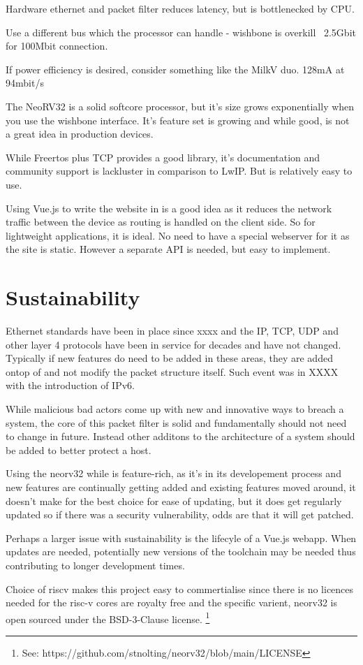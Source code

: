 Hardware ethernet and packet filter reduces latency, but is bottlenecked by CPU.

Use a different bus which the processor can handle - wishbone is overkill ~2.5Gbit for 100Mbit connection.

If power efficiency is desired, consider something like the MilkV duo. 128mA at 94mbit/s

The NeoRV32 is a solid softcore processor, but it's size grows exponentially when you use the wishbone interface. It's feature set is growing and while good, is not a great idea in production devices. 


While Freertos plus TCP provides a good library, it's documentation and community support is lackluster in comparison to LwIP. But is relatively easy to use. 
 
Using Vue.js to write the website in is a good idea as it reduces the network traffic between the device as routing is handled on the client side. So for lightweight applications, it is ideal. No need to have a special webserver for it as the site is static. However a separate API is needed, but easy to implement. 



\section{Sustainability}

Ethernet standards have been in place since xxxx and the IP, TCP, UDP and other layer 4 protocols have been in service for decades and have not changed. Typically if new features do need to be added in these areas, they are added ontop of and not modify the packet structure itself. Such event was in XXXX with the introduction of IPv6.

While malicious bad actors come up with new and innovative ways to breach a system, the core of this packet filter is solid and fundamentally should not need to change in future. Instead other additons to the architecture of a system should be added to better protect a host. 

Using the neorv32 while is feature-rich, as it's in its developement process and new features are continually getting added and existing features moved around, it doesn't make for the best choice for ease of updating, but it does get regularly updated so if there was a security vulnerability, odds are that it will get patched.

Perhaps a larger issue with sustainability is the lifecyle of a Vue.js webapp. When updates are needed, potentially new versions of the toolchain may be needed thus contributing to longer development times. 

Choice of riscv makes this project easy to commertialise since there is no licences needed for the risc-v cores are royalty free and the specific varient, neorv32 is open sourced under the BSD-3-Clause license. \footnote[1]{See: https://github.com/stnolting/neorv32/blob/main/LICENSE}